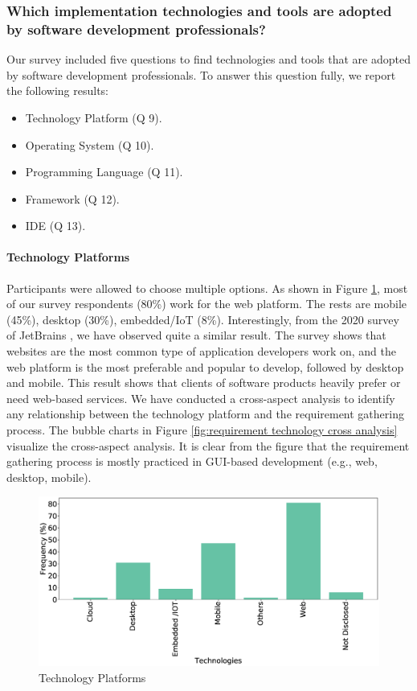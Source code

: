 \subsubsection{Which implementation technologies and tools are adopted by software development professionals?}
\label{tools}
Our survey included five questions to find technologies and tools that are adopted by software development professionals. To answer this question fully, we report the following results:

\begin{itemize}
\item Technology Platform (Q 9).
\item Operating System (Q 10).
\item Programming Language (Q 11).
\item Framework (Q 12).
\item IDE (Q 13).
\end{itemize}


\paragraph{Technology Platforms}
Participants were allowed to choose multiple options. As shown in Figure \ref{fig:platforms}, most of our survey respondents (80\%) work for the web platform. The rests are mobile (45\%), desktop (30\%), embedded/IoT (8\%). Interestingly, from the 2020 survey of JetBrains \cite{JetBrains2020}, we have observed quite a similar result. The survey shows that websites are the most common type of application developers work on, and the web platform is the most preferable and popular to develop, followed by desktop and mobile. This result shows that clients of software products heavily prefer or need web-based services. We have conducted a cross-aspect analysis to identify any relationship between the technology platform and the requirement gathering process. The bubble charts in Figure \ref{fig:requirement technology cross analysis} visualize the cross-aspect analysis. It is clear from the figure that the requirement gathering process is mostly practiced in GUI-based development (e.g., web, desktop, mobile).
\begin{figure}[h]
\centering
  \includegraphics[scale=0.18]{Figures/Respondents_Technologies}
  \caption{Technology Platforms}
  \label{fig:platforms}
\end{figure}

